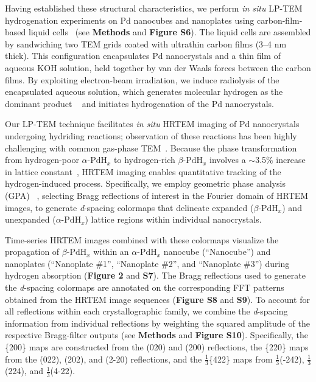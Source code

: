 \documentclass[reprint,amsmath,amssymb,aip,nofootinbib, citeautoscript,]{revtex4-2}
\begin{document}
Having established these structural characteristics, we perform \textit{in situ} LP-TEM hydrogenation experiments on Pd nanocubes and nanoplates using carbon-film-based liquid cells~\cite{lee_atomic_2024,zhang_defect_2022} (see \textbf{Methods} and \textbf{Figure S6}). The liquid cells are assembled by sandwiching two TEM grids coated with ultrathin carbon films (3–4 nm thick). This configuration encapsulates Pd nanocrystals and a thin film of aqueous KOH solution, held together by van der Waals forces between the carbon films. By exploiting electron-beam irradiation, we induce radiolysis of the encapsulated aqueous solution, which generates molecular hydrogen as the dominant product ~\cite{lee_atomic_2024,hart_hydrated_1964,grogan_bubble_2014,schneider_electron_2014} and initiates hydrogenation of the Pd nanocrystals.


Our LP-TEM technique facilitates \textit{in situ} HRTEM imaging of Pd nanocrystals undergoing hydriding reactions; observation of these reactions has been highly challenging with common gas-phase TEM~\cite{angell_lattice_2022,lee_atomic_2024}. Because the phase transformation from hydrogen-poor $\alpha$-$\mathrm{PdH}_x$ to hydrogen-rich $\beta$-$\mathrm{PdH}_x$ involves a $\sim$3.5\% increase in lattice constant~\cite{wicke_hydrogen_1978,wyckoff_structure_1924}, HRTEM imaging enables quantitative tracking of the hydrogen-induced process. Specifically, we employ geometric phase analysis (GPA) ~\cite{hytch_analysis_1997,hytch_quantitative_1998}, selecting Bragg reflections of interest in the Fourier domain of HRTEM images, to generate \textit{d}-spacing colormaps that delineate expanded ($\beta$-$\mathrm{PdH}_x$) and unexpanded ($\alpha$-$\mathrm{PdH}_x$) lattice regions within individual nanocrystals.


Time-series HRTEM images combined with these colormaps visualize the propagation of $\beta$-$\mathrm{PdH}_x$ within an $\alpha$-$\mathrm{PdH}_x$ nanocube (“Nanocube”) and nanoplates (“Nanoplate \#1”, “Nanoplate \#2”, and “Nanoplate \#3”) during hydrogen absorption (\textbf{Figure 2} and \textbf{S7}). The Bragg reflections used to generate the \textit{d}-spacing colormaps are annotated on the corresponding FFT patterns obtained from the HRTEM image sequences (\textbf{Figure S8} and \textbf{S9}). To account for all reflections within each crystallographic family, we combine the \textit{d}-spacing information from individual reflections by weighting the squared amplitude of the respective Bragg-filter outputs (see \textbf{Methods} and \textbf{Figure S10}). Specifically, the \{200\} maps are constructed from the (020) and (200) reflections, the \{220\} maps from the (022), (202), and (2-20) reflections, and the $\frac{1}{3}$\{422\} maps from $\frac{1}{3}$(-242), $\frac{1}{3}$(224), and $\frac{1}{3}$(4-22).
\end{document}
